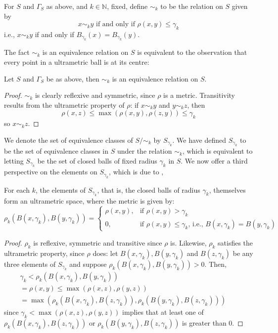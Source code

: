 \begin{definition*}
For $S$ and $\Gamma_S$ as above, and $k \in \mathbb{N}$, fixed,  define $\sim_k$ to  be the relation on $S$ given by \[x \sim_k y\text{ if and only if  }\rho(x,y) \leq \gamma_k\] i.e.,  $x \sim_k y$ if and only if $B_{\gamma_k}(x) = B_{\gamma_k}(y)$.
\end{definition*}

The fact $\sim_k$ is an equivalence relation on $S$ is equivalent to the observation that every point in a ultrametric ball is at its centre:

\begin{lemma*}
Let  $S$ and $\Gamma_S$ be as above, then $\sim_k$ is an equivalence relation on $S$.
\end{lemma*}

\begin{proof}
$\sim_k$ is clearly reflexive and symmetric, since $\rho$ is a metric. Transitivity results from the ultrametric property of $\rho$: if $x \sim_k y$ and $y \sim_k z$, then $$\rho(x, z) \leq \max(\rho(x,y), \rho(z,y)) \leq \gamma_k$$ so $x \sim_k z$. 
\end{proof}

 We denote the set of equivalence classes of $S/\sim_k$ by $S_{\gamma_k}$. We have defined  $S_{\gamma_k}$ to be the set of equivalence classes in $S$ under the relation $\sim_k$, which is equivalent to letting $S_{\gamma_k}$ be the set of closed balls of fixed radius $\gamma_k$ in  $S$. We now offer a third perspective on the elements on $S_{\gamma_k}$, which is due to \cite{na},

\begin{lemma*}
For each $k$, the elements of $S_{\gamma_k}$, that is, the closed balls of radius $\gamma_k$, themselves form an ultrametric space, where the metric is given by:
\[ \rho_k(B(x, \gamma_k),B(y, \gamma_k)) = 
\begin{cases}
\rho(x,y), & \text{if } \rho(x,y) > \gamma_k \\
0, & \text{if }   \rho(x,y) \leq \gamma_k \text{, i.e., } B(x, \gamma_k)=B(y, \gamma_k)
\end{cases}
\]
\end{lemma*}

\begin{proof}
$\rho_k$ is reflexive, symmetric and transitive since $\rho$ is. Likewise, $\rho_k$ satisfies the ultrametric property, since $\rho$ does: let $B(x, \gamma_k),B(y, \gamma_k)$ and $B(z, \gamma_k)$ be any three elements of $S_{\gamma_k}$ and suppose $\rho_k(B(x, \gamma_k),B(y, \gamma_k)) > 0 $. Then,
\begin{align*}
\gamma_k < \rho_k(B(x, \gamma_k),B(y, \gamma_k)) && \\
= \rho(x,y) \leq \max(\rho(x,z), \rho(y,z)) && \\
= \max(\rho_k(B(x, \gamma_k), B(z, \gamma_k)), \rho_k(B(y, \gamma_k),B(z,\gamma_k)))
\end{align*}
since $ \gamma_k < \max(\rho(x,z), \rho(y,z))$ implies that at least one of $\rho_k(B(x, \gamma_k), B(z, \gamma_k))$ or $\rho_k(B(y, \gamma_k),B(z,\gamma_k))$ is greater than $0$.
\end{proof}

